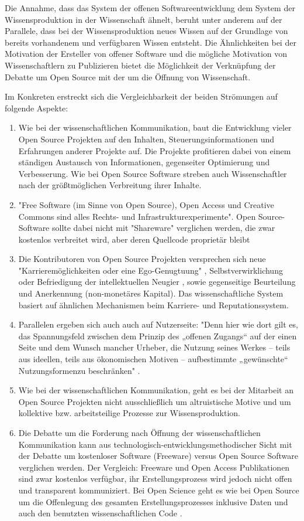 Die Annahme, dass das System der offenen Softwareentwicklung dem System der Wissensproduktion in der Wissenschaft ähnelt, beruht unter anderem auf der Parallele, dass bei der Wissensproduktion neues Wissen auf der Grundlage von bereits vorhandenem und verfügbaren Wissen entsteht. Die Ähnlichkeiten bei der Motivation der Ersteller von offener Software und die mögliche Motivation von Wissenschaftlern zu Publizieren bietet die Möglichkeit der Verknüpfung der Debatte um Open Source mit der um die Öffnung von Wissenschaft.

Im Konkreten erstreckt sich die Vergleichbarkeit der beiden Strömungen auf folgende Aspekte:
\begin{enumerate}
\item Wie bei der wissenschaftlichen Kommunikation, baut die Entwicklung vieler Open Source Projekten auf den Inhalten, Steuerungsinformationen und Erfahrungen anderer Projekte auf. Die Projekte profitieren dabei von einem ständigen Austausch von Informationen, gegenseiter Optimierung und Verbesserung. Wie bei Open Source Software streben auch Wissenschaftler nach der größtmöglichen Verbreitung ihrer Inhalte.
\item "Free Software (im Sinne von Open Source), Open Access und Creative Commons sind alles Rechts- und Infrastrukturexperimente"\cite{kelty_2004}. Open Source-Software sollte dabei nicht mit "Shareware" verglichen werden, die zwar kostenlos verbreitet wird, aber deren Quellcode proprietär bleibt \cite{Lerner_2001}
\item Die Kontributoren von Open Source Projekten versprechen sich neue "Karrieremöglichkeiten oder eine Ego-Genugtuung" \cite{Lerner_2001}, Selbstverwirklichung oder Befriedigung der intellektuellen Neugier \cite{Willinsky_2005}, sowie gegenseitige Beurteilung und Anerkennung (non-monetäres Kapital). Das wissenschaftliche System basiert auf ähnlichen Mechanismen beim Karriere- und Reputationssystem.
\item Parallelen ergeben sich auch auch auf Nutzerseite: "Denn hier wie dort gilt es, das Spannungsfeld zwischen dem Prinzip des „offenen Zugangs“ auf der einen Seite und dem Wunsch mancher Urheber, die Nutzung seines Werkes – teils aus ideellen, teils aus ökonomischen Motiven – aufbestimmte „gewünschte“ Nutzungsformenzu beschränken" \cite{dorschel_2006_open}.
\item Wie bei der wissenschaftlichen Kommunikation, geht es bei der Mitarbeit an Open Source Projekten nicht ausschließlich um altruistische Motive \cite{Lerner_2001} und um kollektive bzw. arbeitsteilige Prozesse zur Wissensproduktion.
\item Die Debatte um die Forderung nach Öffnung der wissenschaftlichen Kommunikation kann aus technologisch-entwicklungsmethodischer Sicht mit der Debatte um kostenloser Software (Freeware) versus Open Source Software verglichen werden. Der Vergleich: Freeware und Open Access Publikationen sind zwar kostenlos verfügbar, ihr Erstellungsprozess wird jedoch nicht offen und transparent kommuniziert. Bei Open Science geht es wie bei Open Source um die Offenlegung des gesamten Erstellungsprozesses inklusive Daten \cite{grand_2012_open} und auch den benutzten wissenschaftlichen Code \cite{hey_2015_open}.
\end{enumerate}

